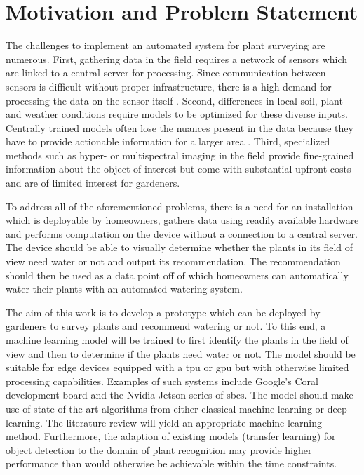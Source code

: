\documentclass[draft,final]{vutinfth} %
\begin{document}
\section{Motivation and Problem Statement}
\label{sec:motivation}

The challenges to implement an automated system for plant surveying
are numerous. First, gathering data in the field requires a network of
sensors which are linked to a central server for processing. Since
communication between sensors is difficult without proper
infrastructure, there is a high demand for processing the data on the
sensor itself \cite{mcenroe2022}. Second, differences in local soil,
plant and weather conditions require models to be optimized for these
diverse inputs. Centrally trained models often lose the nuances
present in the data because they have to provide actionable
information for a larger area \cite{awad2019}. Third, specialized
methods such as hyper- or multispectral imaging in the field provide
fine-grained information about the object of interest but come with
substantial upfront costs and are of limited interest for gardeners.

To address all of the aforementioned problems, there is a need for an
installation which is deployable by homeowners, gathers data using
readily available hardware and performs computation on the device
without a connection to a central server. The device should be able to
visually determine whether the plants in its field of view need water
or not and output its recommendation. The recommendation should then
be used as a data point off of which homeowners can automatically
water their plants with an automated watering system.

The aim of this work is to develop a prototype which can be deployed
by gardeners to survey plants and recommend watering or not. To this
end, a machine learning model will be trained to first identify the
plants in the field of view and then to determine if the plants need
water or not. The model should be suitable for edge devices equipped
with a \gls{tpu} or \gls{gpu} but with otherwise limited processing
capabilities. Examples of such systems include Google's Coral
development board and the Nvidia Jetson series of \glspl{sbc}. The
model should make use of state-of-the-art algorithms from either
classical machine learning or deep learning. The literature review
will yield an appropriate machine learning method. Furthermore, the
adaption of existing models (transfer learning) for object detection
to the domain of plant recognition may provide higher performance than
would otherwise be achievable within the time constraints.
\end{document}
